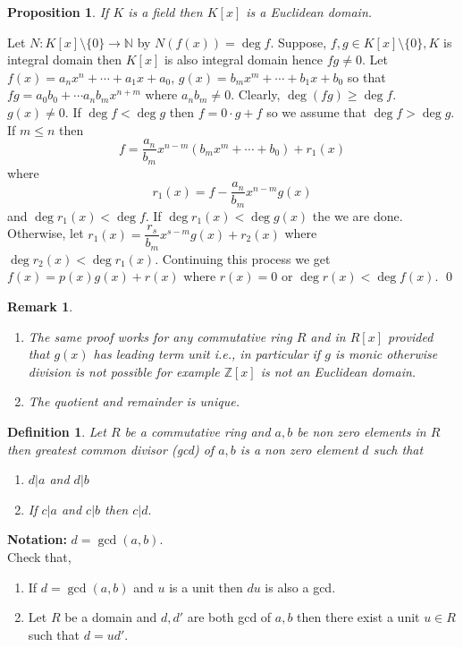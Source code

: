 \documentclass[11pt]{amsart}
\newtheorem{definition}[theorem]{Definition}%
\newtheorem{proposition}[theorem]{Proposition}%
\newtheorem*{remark*}{Remark}
\newcommand{\ZZ}{\mathbb Z}
\newcommand{\NN}{\mathbb N}
\begin{document}
\begin{proposition}
If $K$ is a field then $K[x]$ is a Euclidean domain.
\end{proposition}
\proof Let $N:K[x]\setminus \{0\} \to {\NN}$ by $N(f(x))=\deg f.$ Suppose,
$f,g\in K[x]\setminus \{0\}, K$ is integral domain then $K[x]$ is also integral domain hence $fg\neq 0.$ Let $f(x)=a_nx^n+\cdots +a_1x+a_0$, $g(x)=b_mx^m+\cdots +b_1x+b_0$ so that $fg=a_0b_0+\cdots a_nb_mx^{n+m}$ where $a_nb_m\neq 0.$ Clearly, $\deg (fg)\geq \deg f.$ $g(x)\neq 0.$ If $\deg f<\deg g$ then $f=0\cdot g+f$ so we assume that $\deg f>\deg g.$ If $m\leq n$ then $$f=\dfrac{a_n}{b_m}x^{n-m}(b_mx^m+\cdots +b_0)+r_1(x)$$ where $$r_1(x)=f-\dfrac{a_n}{b_m}x^{n-m}g(x)$$ and $\deg r_1(x)<\deg f$. If $\deg r_1(x)<\deg g(x)$ the we are done. Otherwise, let $r_1(x)=\dfrac{r_s}{b_m}x^{s-m}g(x)+r_2(x)$ where $\deg r_2(x)<\deg r_1(x).$ Continuing this process we get $f(x)=p(x)g(x)+r(x)$ where $r(x)=0$ or $\deg r(x)<\deg f(x).$ \qed
\begin{remark*}
\begin{enumerate}
\item The same proof works for any commutative ring $R$ and in $R[x]$ provided that $g(x)$ has leading term unit i.e., in particular if $g$ is monic otherwise division is not possible for example ${\ZZ}[x]$ is not an Euclidean domain.
\item The quotient and remainder is unique.
\end{enumerate}
\end{remark*}
\begin{definition}
Let $R$ be a commutative ring and $a,b$ be non zero elements in $R$ then greatest common divisor (gcd) of $a,b$ is a non zero element $d$ such that \begin{enumerate}
\item $d|a$ and $d|b$
\item If $c|a$ and $c|b$ then $c|d.$
\end{enumerate}
\end{definition}
\textbf{Notation:} $d=\gcd (a,b).$\\
Check that, \begin{enumerate}
\item If $d=\gcd (a,b)$ and $u$ is a unit then $du$ is also a gcd.
\item Let $R$ be a domain and $d,d'$ are both gcd of $a,b$ then there exist a unit $u\in R$ such that $d=ud'.$
\end{enumerate} 
\end{document}
